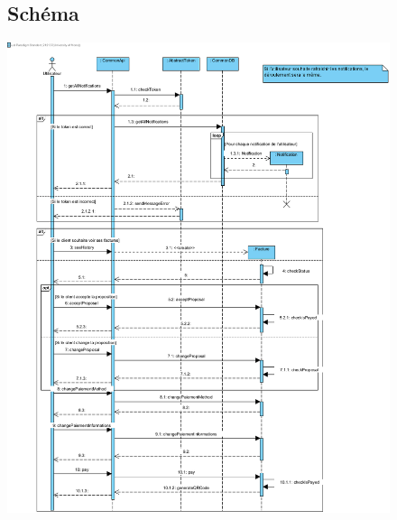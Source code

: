 \begin{figure}[h]
\subsection{Schéma}
\centering
\includegraphics[width = 1\textwidth]{extension-maxime/sequence/img/sequence-extension.png}
\end{figure}

